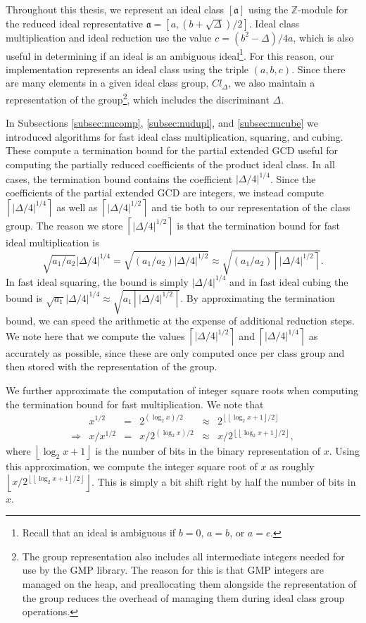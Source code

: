 \documentclass{ucalgthes1}
\theoremstyle{definition}
\newcommand{\ZZ}{\mathbb{Z}}
\newcommand{\floor}[1]{\left\lfloor #1 \right\rfloor}
\newcommand{\ceil}[1]{\left\lceil #1 \right\rceil}
\begin{document}
Throughout this thesis, we represent an ideal class $[\mathfrak a]$ using the $\ZZ$-module for the reduced ideal representative $\mathfrak a = [a, (b + \sqrt{\Delta})/2]$.  Ideal class multiplication and ideal reduction use the value $c = (b^2 - \Delta)/4a$, which is also useful in determining if an ideal is an ambiguous ideal\footnote{Recall that an ideal is ambiguous if $b=0$, $a=b$, or $a=c$.}.  For this reason, our implementation represents an ideal class using the triple $(a, b, c)$.  Since there are many elements in a given ideal class group, $Cl_\Delta$, we also maintain a representation of the group\footnote{The group representation also includes all intermediate integers needed for use by the GMP library.  The reason for this is that GMP integers are managed on the heap, and preallocating them alongside the representation of the group reduces the overhead of managing them during ideal class group operations.}, which includes the discriminant $\Delta$.

In Subsections \ref{subsec:nucomp}, \ref{subsec:nudupl}, and \ref{subsec:nucube} we introduced algorithms for fast ideal class multiplication, squaring, and cubing.  These compute a termination bound for the partial extended GCD useful for computing the partially reduced coefficients of the product ideal class.  In all cases, the termination bound contains the coefficient $|\Delta/4|^{1/4}$.  Since the coefficients of the partial extended GCD are integers, we instead compute $\ceil{|\Delta/4|^{1/4}}$ as well as $\ceil{|\Delta/4|^{1/2}}$ and tie both to our representation of the class group.  The reason we store $\ceil{|\Delta/4|^{1/2}}$ is that the termination bound for fast ideal multiplication is
\[
\sqrt{a_1/a_2}|\Delta/4|^{1/4} = \sqrt{(a_1/a_2) |\Delta/4|^{1/2}} \approx \sqrt{(a_1/a_2) \ceil{|\Delta/4|^{1/2}}}.
\]
In fast ideal squaring, the bound is simply $|\Delta/4|^{1/4}$ and in fast ideal cubing the bound is $\sqrt{a_1}|\Delta/4|^{1/4} \approx \sqrt{a_1\ceil{|\Delta/4|^{1/2}}}$. By approximating the termination bound, we can speed the arithmetic at the expense of additional reduction steps. We note here that we compute the values $\ceil{|\Delta/4|^{1/2}}$ and $\ceil{|\Delta/4|^{1/4}}$ as accurately as possible, since these are only computed once per class group and then stored with the representation of the group.

We further approximate the computation of integer square roots when computing the termination bound for fast multiplication.  We note that 
\begin{equation*}
\begin{array}{rrlrlr}
	& x^{1/2} &=& 2^{(\log_2x)/2} &\approx& 2^{\floor{\floor{\log_2x+1}/2}} \\
	\Rightarrow & x / x^{1/2} &=& x / 2^{(\log_2x)/2} &\approx& x / 2^{\floor{\floor{\log_2x+1}/2}},
\end{array}
\end{equation*}
where $\floor{\log_2x+1}$ is the number of bits in the binary representation of $x$.  Using this approximation, we compute the integer square root of $x$ as roughly $\floor{x / 2^{\floor{\floor{\log_2x+1}/2}}}$.  This is simply a bit shift right by half the number of bits in $x$.
\end{document}
